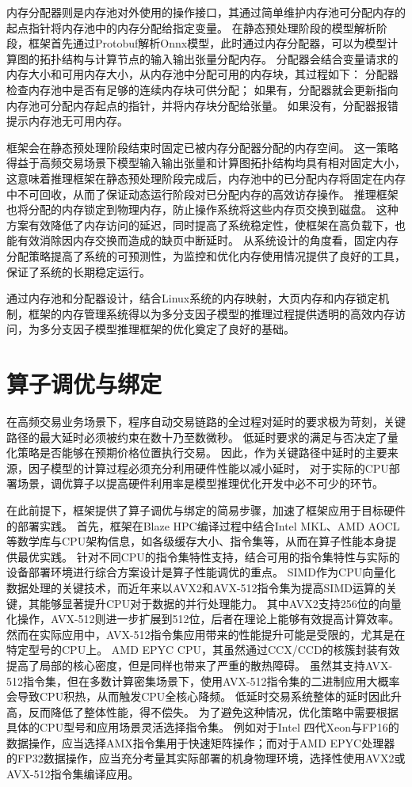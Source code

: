 内存分配器则是内存池对外使用的操作接口，其通过简单维护内存池可分配内存的起点指针将内存池中的内存分配给指定变量。
在静态预处理阶段的模型解析阶段，框架首先通过Protobuf解析Onnx模型，此时通过内存分配器，可以为模型计算图的拓扑结构与计算节点的输入输出张量分配内存。
分配器会结合变量请求的内存大小和可用内存大小，从内存池中分配可用的内存块，其过程如下：
分配器检查内存池中是否有足够的连续内存块可供分配；
如果有，分配器就会更新指向内存池可分配内存起点的指针，并将内存块分配给张量。
如果没有，分配器报错提示内存池无可用内存。

框架会在静态预处理阶段结束时固定已被内存分配器分配的内存空间。
这一策略得益于高频交易场景下模型输入输出张量和计算图拓扑结构均具有相对固定大小，
这意味着推理框架在静态预处理阶段完成后，内存池中的已分配内存将固定在内存中不可回收，从而了保证动态运行阶段对已分配内存的高效访存操作。
推理框架也将分配的内存锁定到物理内存，防止操作系统将这些内存页交换到磁盘。
这种方案有效降低了内存访问的延迟，同时提高了系统稳定性，使框架在高负载下，也能有效消除因内存交换而造成的缺页中断延时。
从系统设计的角度看，固定内存分配策略提高了系统的可预测性，为监控和优化内存使用情况提供了良好的工具，保证了系统的长期稳定运行。

通过内存池和分配器设计，结合Linux系统的内存映射，大页内存和内存锁定机制，框架的内存管理系统得以为多分支因子模型的推理过程提供透明的高效内存访问，为多分支因子模型推理框架的优化奠定了良好的基础。

\section{算子调优与绑定}
在高频交易业务场景下，程序自动交易链路的全过程对延时的要求极为苛刻，关键路径的最大延时必须被约束在数十乃至数微秒。
低延时要求的满足与否决定了量化策略是否能够在预期价格位置执行交易。
因此，作为关键路径中延时的主要来源，因子模型的计算过程必须充分利用硬件性能以减小延时，
对于实际的CPU部署场景，调优算子以提高硬件利用率是模型推理优化开发中必不可少的环节。

在此前提下，框架提供了算子调优与绑定的简易步骤，加速了框架应用于目标硬件的部署实践。
首先，框架在Blaze HPC编译过程中结合Intel MKL、AMD AOCL等数学库与CPU架构信息，如各级缓存大小、指令集等，从而在算子性能本身提供最优实践。
针对不同CPU的指令集特性支持，结合可用的指令集特性与实际的设备部署环境进行综合方案设计是算子性能调优的重点。
SIMD作为CPU向量化数据处理的关键技术，而近年来以AVX2和AVX-512指令集为提高SIMD运算的关键，其能够显著提升CPU对于数据的并行处理能力。
其中AVX2支持256位的向量化操作，AVX-512则进一步扩展到512位，后者在理论上能够有效提高计算效率。
然而在实际应用中，AVX-512指令集应用带来的性能提升可能是受限的，尤其是在特定型号的CPU上。
AMD EPYC CPU，其虽然通过CCX/CCD的核簇封装有效提高了局部的核心密度，但是同样也带来了严重的散热障碍。
虽然其支持AVX-512指令集，但在多数计算密集场景下，使用AVX-512指令集的二进制应用大概率会导致CPU积热，从而触发CPU全核心降频。
低延时交易系统整体的延时因此升高，反而降低了整体性能，得不偿失。
为了避免这种情况，优化策略中需要根据具体的CPU型号和应用场景灵活选择指令集。
例如对于Intel 四代Xeon与FP16的数据操作，应当选择AMX指令集用于快速矩阵操作；而对于AMD EPYC处理器的FP32数据操作，应当充分考量其实际部署的机身物理环境，选择性使用AVX2或AVX-512指令集编译应用。

